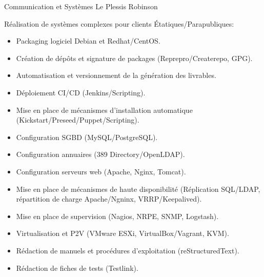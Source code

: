 \documentclass[10pt,a4paper,sans]{moderncv}        %
\begin{document}
        {Communication et Systèmes}
        {Le Plessis Robinson}
        {}
        {Réalisation de systèmes complexes pour clients Étatiques/Parapubliques:
            \begin{itemize}
            \item Packaging logiciel Debian et Redhat/CentOS.
            \item Création de dépôts et signature de packages (Reprepro/Createrepo, GPG).
            \item Automatisation et versionnement de la génération des livrables.
            \item Déploiement CI/CD (Jenkins/Scripting).
            \item Mise en place de mécanismes d'installation automatique (Kickstart/Preseed/Puppet/Scripting).
            \item Configuration SGBD (MySQL/PostgreSQL).
            \item Configuration annuaires (389 Directory/OpenLDAP).
            \item Configuration serveurs web (Apache, Nginx, Tomcat).
            \item Mise en place de mécanismes de haute disponibilité (Réplication SQL/LDAP, répartition de charge Apache/Ngninx, VRRP/Keepalived).
            \item Mise en place de supervision (Nagios, NRPE, SNMP, Logstash).
            \item Virtualisation et P2V (VMware ESXi, VirtualBox/Vagrant, KVM).
            \item Rédaction de manuels et procédures d'exploitation (reStructuredText).
            \item Rédaction de fiches de tests (Testlink).
            \end{itemize}
        }
\end{document}
